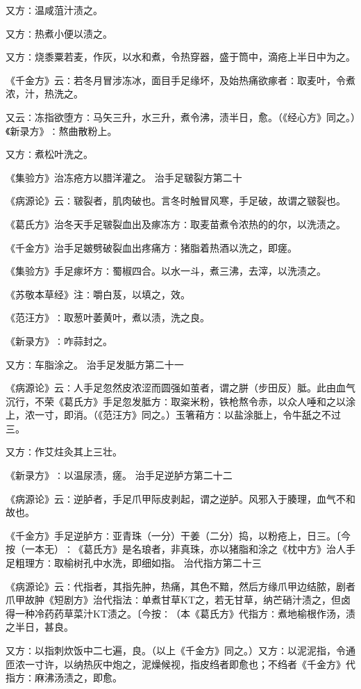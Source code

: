 \documentclass[a4paper,12pt,UTF8,twoside]{ctexbook}
\begin{document}
又方∶温咸菹汁渍之。

又方∶热煮小便以渍之。

又方∶烧黍粟若麦，作灰，以水和煮，令热穿器，盛于筒中，滴疮上半日中为之。

《千金方》云∶若冬月冒涉冻冰，面目手足缘坏，及始热痛欲瘃者∶取麦叶，令煮浓，汁，热洗之。

又云∶冻指欲堕方∶马矢三升，水三升，煮令沸，渍半日，愈。（《经心方》同之。）《新录方》∶熬曲散粉上。

又方∶煮松叶洗之。

《集验方》治冻疮方以腊洋灌之。
治手足皲裂方第二十

《病源论》云∶皲裂者，肌肉破也。言冬时触冒风寒，手足破，故谓之皲裂也。

《葛氏方》治冬天手足皲裂血出及瘃冻方∶取麦苗煮令浓热的的尔，以洗渍之。

《千金方》治手足皴劈破裂血出疼痛方∶猪脂着热酒以洗之，即瘥。

《集验方》手足瘃坏方∶蜀椒四合。以水一斗，煮三沸，去滓，以洗渍之。

《苏敬本草经》注∶嚼白芨，以填之，效。

《范汪方》∶取葱叶萎黄叶，煮以渍，洗之良。

《新录方》∶咋蒜封之。

又方∶车脂涂之。
治手足发胝方第二十一

《病源论》云∶人手足忽然皮浓涩而圆强如茧者，谓之胼（步田反）胝。此由血气沉行，不荣《葛氏方》手足忽发胝方∶取粢米粉，铁枪熬令赤，以众人唾和之以涂上，浓一寸，即消。（《范汪方》同之。）玉箸葙方∶以盐涂胝上，令牛舐之不过三。

又方∶作艾炷灸其上三壮。

《新录方》∶以温尿渍，瘥。
治手足逆胪方第二十二

《病源论》云∶逆胪者，手足爪甲际皮剥起，谓之逆胪。风邪入于腠理，血气不和故也。

《千金方》手足逆胪方∶亚青珠（一分）干姜（二分）捣，以粉疮上，日三。〔今按（一本无）∶《葛氏方》是名琅者，非真珠，亦以猪脂和涂之《枕中方》治人手足粗理方∶取榆树孔中水洗，即细如指。
治代指方第二十三

《病源论》云∶代指者，其指先肿，热痛，其色不黯，然后方缘爪甲边结脓，剧者爪甲故肿《短剧方》治代指法∶单煮甘草KT之，若无甘草，纳芒硝汁渍之，但卤得一种冷药药草菜汁KT渍之。〔今按∶（本《葛氏方》代指方∶煮地榆根作汤，渍之半日，甚良。

又方∶以指刺炊饭中二七遍，良。（以上《千金方》同之。）又方∶以泥泥指，令通匝浓一寸许，以纳热灰中炮之，泥燥候视，指皮绉者即愈也；不绉者《千金方》代指方∶麻沸汤渍之，即愈。
\end{document}
